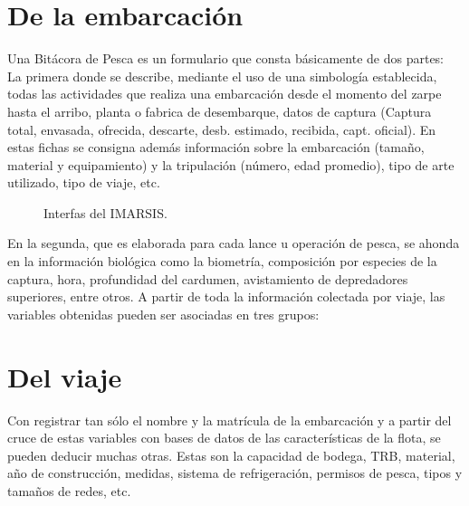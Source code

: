 \documentclass[a4paper,oneside,11pt]{book}
\begin{document}
\section{De la embarcación} 
Una Bitácora de Pesca es un formulario que consta básicamente de dos partes:\\
La primera donde se describe, mediante el uso de una simbología establecida, todas las actividades que realiza una embarcación desde el momento del zarpe hasta el arribo, planta o fabrica de desembarque, datos de captura (Captura total, envasada, ofrecida, descarte, desb. estimado, recibida, capt. oficial). En estas fichas se consigna además información sobre la embarcación (tamaño, material y equipamiento) y la tripulación (número, edad promedio), tipo de arte utilizado, tipo de viaje, etc.

 \begin{figure}[!h]
  \begin{center} 
  \caption{Interfas del IMARSIS.}
 \end{center}
  \end{figure}

En la segunda, que es elaborada para cada lance u operación de pesca, se ahonda en la información biológica como la biometría, composición por especies de la captura, hora, profundidad del cardumen, avistamiento de depredadores superiores, entre otros.
A partir de toda la información colectada por viaje, las variables obtenidas pueden ser asociadas en tres grupos:

\section{Del viaje} 
Con registrar tan sólo el nombre y la matrícula de la
embarcación y a partir del cruce de estas variables con bases de datos de las características de la flota, se pueden deducir muchas otras. Estas son la capacidad de bodega, TRB, material, año de construcción, medidas, sistema de refrigeración, permisos de pesca, tipos y tamaños de redes, etc.
\end{document}
